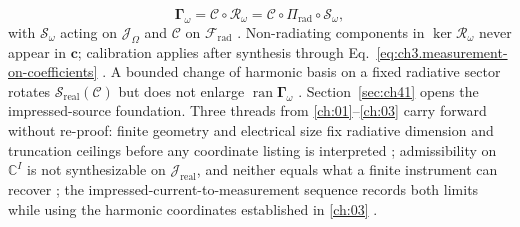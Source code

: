 \begin{equation}
\label{eq:ch4.gamma-composition-consumed}
\boldsymbol{\Gamma}_\omega
=
\mathcal{C}\circ\mathcal{R}_\omega
=
\mathcal{C}\circ\Pi_{\mathrm{rad}}\circ\mathcal{S}_\omega,
\end{equation}
with $\mathcal{S}_\omega$ acting on $\mathcal{J}_\Omega$ and $\mathcal{C}$ on $\mathcal{F}_{\mathrm{rad}}$
\cite{stratton1941}. Non-radiating components in $\ker\mathcal{R}_\omega$ never appear in
$\mathbf{c}$; calibration applies after synthesis through
Eq.~\eqref{eq:ch3.measurement-on-coefficients} \cite{devaney2004}.
\label{lem:ch4.synthesis-not-chart-invariant}
A bounded change of harmonic basis on a fixed radiative sector rotates $\mathcal{S}_{\mathrm{real}}(\mathcal{C})$
but does not enlarge $\operatorname{ran}\boldsymbol{\Gamma}_\omega$ \cite{hansen1988}.
Section~\ref{sec:ch41} opens the impressed-source foundation.
Three threads from \ref{ch:01}--\ref{ch:03} carry forward without re-proof: finite geometry and electrical size fix radiative dimension and truncation ceilings before any coordinate listing is interpreted \cite{chu1948}; admissibility on $\mathbb{C}^{I}$ is not synthesizable on $\mathcal{J}_{\mathrm{real}}$, and neither equals what a finite instrument can recover \cite{maxwell1873}; the impressed-current-to-measurement sequence records both limits while using the harmonic coordinates established in \ref{ch:03} \cite{harrington2001}.

